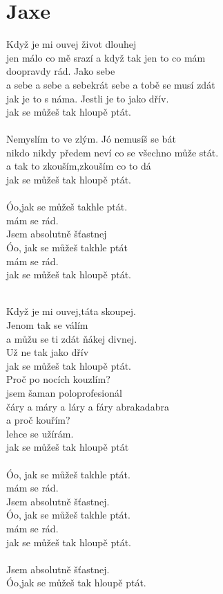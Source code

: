 \section{Jaxe}
Když je mi ouvej život dlouhej\\
jen málo co mě srazí a když tak jen to co mám\\
doopravdy rád. Jako sebe\\
a sebe a sebe a sebekrát sebe a tobě se musí zdát\\
jak je to s náma. Jestli je to jako dřív.\\
jak se můžeš tak hloupě ptát.\\
\\
Nemyslím to ve zlým. Jó nemusíš se bát\\
nikdo nikdy předem neví co se všechno může stát.\\
a tak to zkouším,zkouším co to dá\\
jak se můžeš tak hloupě ptát.\\
\\
Óo,jak se můžeš takhle ptát.\\
mám se rád.\\
Jsem absolutně šťastnej\\
Óo, jak se můžeš takhle ptát \\
mám se rád.\\
jak se můžeš tak hloupě ptát.\\
\\
\begin{multicols}{2}
Když je mi ouvej,táta skoupej. \\
Jenom tak se válím \\
a můžu se ti zdát ňákej divnej.\\
Už ne tak jako dřív\\
jak se můžeš tak hloupě ptát.\\
Proč po nocích kouzlím?\\
jsem šaman poloprofesionál\\
čáry a máry a láry a fáry abrakadabra\\
a proč kouřím? \\
lehce se užírám.\\
jak se můžeš tak hloupě ptát\\
\columnbreak
\\
Óo, jak se můžeš takhle ptát.\\
mám se rád.\\
Jsem absolutně šťastnej.\\
Óo, jak se můžeš takhle ptát.\\ 
mám se rád.\\
jak se můžeš tak hloupě ptát.\\
\\
Jsem absolutně šťastnej.\\
Óo,jak se můžeš tak hloupě ptát.\\
\end{multicols}